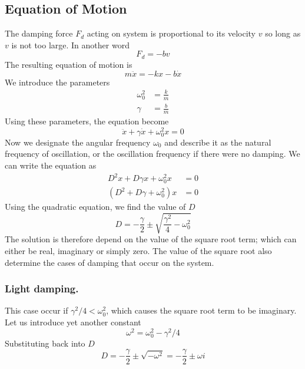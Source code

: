 \documentclass[../../../main.tex]{subfiles}
\begin{document}
\subsection{Equation of Motion} 
The damping force $F_d$ acting on system is proportional to its velocity $v$ so long as $v$ is not too large. In another word
\begin{equation*}
    F_d=-bv
\end{equation*}
The resulting equation of motion is
\begin{equation*}
    m\ddot{x}=-kx-b\dot{x}
\end{equation*}
We introduce the parameters
\begin{align*}
    \omega_0^2&=\frac{k}{m}\\
    \gamma&=\frac{b}{m}
\end{align*}
Using these parameters, the equation become
\begin{equation*}
    \ddot{x}+\gamma\dot{x}+\omega_0^2 x=0
\end{equation*}
Now we designate the angular frequency $\omega_0$ and describe it as the natural frequency of oscillation, or the oscillation frequency if there were no damping. We can write the equation as\begin{align*}
    D^2x+D\gamma x+\omega_0^2x&=0\\
    (D^2+D\gamma +\omega_0^2)x&=0
\end{align*}
Using the quadratic equation, we find the value of $D$
\begin{equation*}
    D=-\frac{\gamma}{2}\pm \sqrt{\frac{\gamma^2}{4}-\omega_0^2}
\end{equation*}
The solution is therefore depend on the value of the square root term; which can either be real, imaginary or simply zero. The value of the square root also determine the cases of damping that occur on the system. 


\subsubsection{Light damping.} This case occur if $\gamma^2/4<\omega_0^2$, which causes the square root term to be imaginary. Let us introduce yet another constant
\begin{equation*}
    \omega^2=\omega_0^2-\gamma^2/4
\end{equation*}
Substituting back into $D$
\begin{equation*}
    D=-\frac{\gamma}{2}\pm \sqrt{-\omega^2}=-\frac{\gamma}{2}\pm \omega i
\end{equation*}
\end{document}
